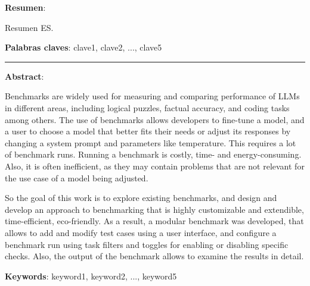 \textbf{Resumen}:

Resumen ES.

\textbf{Palabras claves}: clave1, clave2, ..., clave5

\vspace{1cm}
\begin{center}
  \rule{0.5\textwidth}{.4pt}
\end{center}
\vspace{1cm}

\textbf{Abstract}:


Benchmarks are widely used for measuring and comparing performance of LLMs in different areas, including logical puzzles, factual accuracy, and coding tasks among others. 
The use of benchmarks allows developers to fine-tune a model, and a user to choose a model that better fits their needs or adjust its responses by changing a system prompt and parameters like temperature. 
This requires a lot of benchmark runs. Running a benchmark is costly, time- and energy-consuming. Also, it is often inefficient, as they may contain problems that are not relevant for the use case of a model being adjusted. 

So the goal of this work is to explore existing benchmarks, and design and develop an approach to benchmarking that is highly customizable and extendible, time-efficient, eco-friendly. As a result, a modular benchmark was developed, that allows to add and modify test cases using a user interface, and configure a benchmark run using task filters and toggles for enabling or disabling specific checks. Also, the output of the benchmark allows to examine the results in detail. 

\textbf{Keywords}: keyword1, keyword2, ..., keyword5

